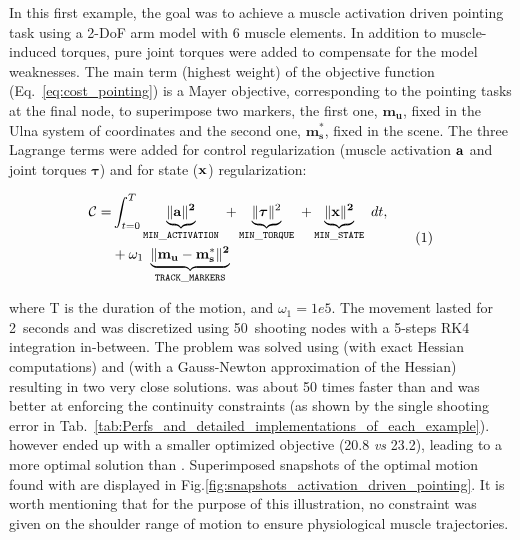 In this first example, the goal was to achieve a muscle activation driven pointing task using a 2-DoF arm model with 6 muscle elements. 
In addition to muscle-induced torques, pure joint torques were added to compensate for the model weaknesses.
The main term (highest weight) of the objective function (Eq.~\ref{eq:cost_pointing}) is a Mayer objective, corresponding to the pointing tasks at the final node, to superimpose two markers, the first one, $\mathbf{m_u}$, fixed in the Ulna system of coordinates and the second one, $\mathbf{m^*_s}$, fixed in the scene.
The three Lagrange terms  were added for control regularization (muscle activation $\bf{a}$ and joint torques $\boldsymbol{\tau}$) and for state ($\bf{x}$) regularization:

\[
\begin{aligned}
	\mathcal{C} = &\int_{t=0}^T\underbrace{\|\bf{a}\|^2}_{\mathtt{MIN\_ACTIVATION}}~
	+\underbrace{\|\boldsymbol\tau\|^2}_{\mathtt{MIN\_TORQUE}}~
	+\underbrace{\|\bf{x}\|^2}_{\mathtt{MIN\_STATE}}~ dt,\\
	&+ \omega_1~\underbrace{\|\bf m_u-\bf m^*_s\|^2}_{\mathtt{TRACK\_MARKERS}}~
\end{aligned}
\addtag
\label{eq:cost_pointing}
\]
%

\noindent where T is the duration of the motion, and $\omega_1=1e5$.
The movement lasted for 2~seconds and was discretized using 50~shooting nodes with a 5-steps RK4 integration in-between.
The problem was solved using \ipopt (with exact Hessian computations) and \acados (with a Gauss-Newton approximation of the Hessian) resulting in two very close solutions.
\acados was about 50 times faster than \ipopt and was better at enforcing the continuity constraints (as shown by the single shooting error in Tab.~\ref{tab:Perfs_and_detailed_implementations_of_each_example}).
\ipopt however ended up with a smaller optimized objective (20.8 \textit{vs} 23.2), leading to a more optimal solution than \acados. 
Superimposed snapshots of the optimal motion found with \acados are displayed in Fig.\ref{fig:snapshots_activation_driven_pointing}.
It is worth mentioning that for the purpose of this illustration, no constraint was given on the shoulder range of motion to ensure physiological muscle trajectories. 

